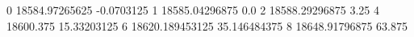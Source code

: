 0 18584.97265625 -0.0703125
1 18585.04296875 0.0
2 18588.29296875 3.25
4 18600.375 15.33203125
6 18620.189453125 35.146484375
8 18648.91796875 63.875
